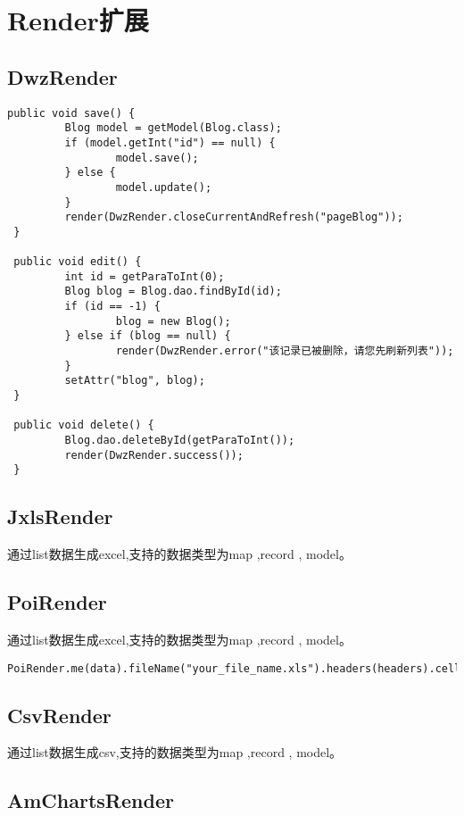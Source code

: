 \documentclass{scrartcl}
\begin{document}
\section{Render扩展}
\label{sec-3}
\subsection{DwzRender}
\label{sec-3-1}


\begin{verbatim}
public void save() {
         Blog model = getModel(Blog.class);
         if (model.getInt("id") == null) {
                 model.save();
         } else {
                 model.update();
         }
         render(DwzRender.closeCurrentAndRefresh("pageBlog"));
 }

 public void edit() {
         int id = getParaToInt(0);
         Blog blog = Blog.dao.findById(id);
         if (id == -1) {
                 blog = new Blog();
         } else if (blog == null) {
                 render(DwzRender.error("该记录已被删除，请您先刷新列表"));
         }
         setAttr("blog", blog);
 }

 public void delete() {
         Blog.dao.deleteById(getParaToInt());
         render(DwzRender.success());
 }
\end{verbatim}
\subsection{JxlsRender}
\label{sec-3-2}

   通过list数据生成excel,支持的数据类型为map ,record , model。
\subsection{PoiRender}
\label{sec-3-3}

   通过list数据生成excel,支持的数据类型为map ,record , model。

\begin{verbatim}
PoiRender.me(data).fileName("your_file_name.xls").headers(headers).cellWidth(5000).headerRow(2)
\end{verbatim}
  
\subsection{CsvRender}
\label{sec-3-4}

   通过list数据生成csv,支持的数据类型为map ,record , model。
\subsection{AmChartsRender}
\label{sec-3-5}
\end{document}
